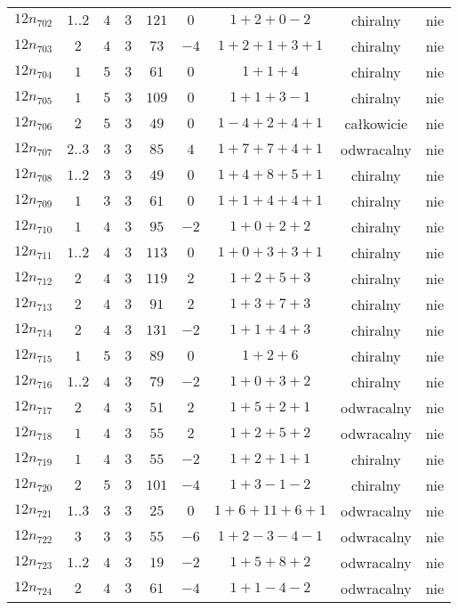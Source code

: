\begin{longtable}{ccccccccc}
$12n_{702}$ & $1..2$ & $4$ & $3$ & $121$ & $0$ & $1+2+0-2$ & chiralny & nie \\
$12n_{703}$ & $2$ & $4$ & $3$ & $73$ & $-4$ & $1+2+1+3+1$ & chiralny & nie \\
$12n_{704}$ & $1$ & $5$ & $3$ & $61$ & $0$ & $1+1+4$ & chiralny & nie \\
$12n_{705}$ & $1$ & $5$ & $3$ & $109$ & $0$ & $1+1+3-1$ & chiralny & nie \\
$12n_{706}$ & $2$ & $5$ & $3$ & $49$ & $0$ & $1-4+2+4+1$ & całkowicie & nie \\
$12n_{707}$ & $2..3$ & $3$ & $3$ & $85$ & $4$ & $1+7+7+4+1$ & odwracalny & nie \\
$12n_{708}$ & $1..2$ & $3$ & $3$ & $49$ & $0$ & $1+4+8+5+1$ & chiralny & nie \\
$12n_{709}$ & $1$ & $3$ & $3$ & $61$ & $0$ & $1+1+4+4+1$ & chiralny & nie \\
$12n_{710}$ & $1$ & $4$ & $3$ & $95$ & $-2$ & $1+0+2+2$ & chiralny & nie \\
$12n_{711}$ & $1..2$ & $4$ & $3$ & $113$ & $0$ & $1+0+3+3+1$ & chiralny & nie \\
$12n_{712}$ & $2$ & $4$ & $3$ & $119$ & $2$ & $1+2+5+3$ & chiralny & nie \\
$12n_{713}$ & $2$ & $4$ & $3$ & $91$ & $2$ & $1+3+7+3$ & chiralny & nie \\
$12n_{714}$ & $2$ & $4$ & $3$ & $131$ & $-2$ & $1+1+4+3$ & chiralny & nie \\
$12n_{715}$ & $1$ & $5$ & $3$ & $89$ & $0$ & $1+2+6$ & chiralny & nie \\
$12n_{716}$ & $1..2$ & $4$ & $3$ & $79$ & $-2$ & $1+0+3+2$ & chiralny & nie \\
$12n_{717}$ & $2$ & $4$ & $3$ & $51$ & $2$ & $1+5+2+1$ & odwracalny & nie \\
$12n_{718}$ & $1$ & $4$ & $3$ & $55$ & $2$ & $1+2+5+2$ & odwracalny & nie \\
$12n_{719}$ & $1$ & $4$ & $3$ & $55$ & $-2$ & $1+2+1+1$ & chiralny & nie \\
$12n_{720}$ & $2$ & $5$ & $3$ & $101$ & $-4$ & $1+3-1-2$ & chiralny & nie \\
$12n_{721}$ & $1..3$ & $3$ & $3$ & $25$ & $0$ & $1+6+11+6+1$ & odwracalny & nie \\
$12n_{722}$ & $3$ & $3$ & $3$ & $55$ & $-6$ & $1+2-3-4-1$ & odwracalny & nie \\
$12n_{723}$ & $1..2$ & $4$ & $3$ & $19$ & $-2$ & $1+5+8+2$ & odwracalny & nie \\
$12n_{724}$ & $2$ & $4$ & $3$ & $61$ & $-4$ & $1+1-4-2$ & odwracalny & nie \\

\end{longtable}
